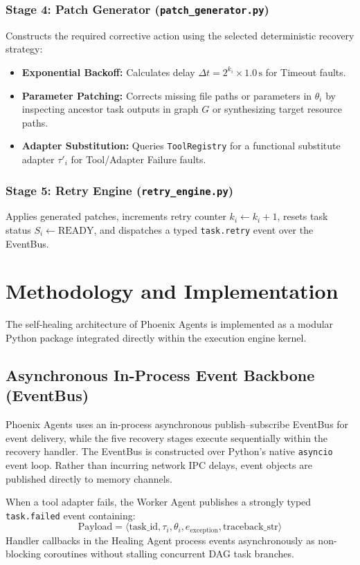 \documentclass[conference]{IEEEtran}
\newcommand{\chg}[1]{{\color{blue}#1}}
\begin{document}
\subsubsection{Stage 4: Patch Generator (\texttt{patch\_generator.py})}
Constructs the required corrective action using the selected deterministic recovery strategy:
\begin{itemize}
    \item \textbf{Exponential Backoff:} Calculates delay $\Delta t = 2^{k_i} \times 1.0\,\text{s}$ for Timeout faults.
    \item \textbf{Parameter Patching:} Corrects missing file paths or parameters in $\theta_i$ by inspecting ancestor task outputs in graph $G$ \chg{or synthesizing target resource paths.}
    \item \textbf{Adapter Substitution:} Queries \texttt{ToolRegistry} for a functional substitute adapter $\tau'_i$ for Tool/Adapter Failure faults.
\end{itemize}

\subsubsection{Stage 5: Retry Engine (\texttt{retry\_engine.py})}
Applies generated patches, increments retry counter $k_i \leftarrow k_i + 1$, resets task status $S_i \leftarrow \text{READY}$, and dispatches a typed \texttt{task.retry} \chg{event over the EventBus.}

\section{Methodology and Implementation}
The self-healing architecture of Phoenix Agents is implemented as a modular \chg{Python package} integrated directly within the execution engine kernel.

\subsection{Asynchronous In-Process Event Backbone (EventBus)}
Phoenix Agents uses an in-process asynchronous publish--subscribe EventBus for event delivery, while the five recovery stages execute sequentially within the recovery handler. The EventBus is constructed over Python's native \texttt{asyncio} event loop. Rather than incurring network IPC delays, event objects are published directly to memory channels.

When a tool adapter fails, the Worker Agent publishes a strongly typed \texttt{task.failed} event containing:
\begin{equation}
\text{Payload} = \langle \text{task\_id}, \tau_i, \theta_i, e_{\text{exception}}, \text{traceback\_str} \rangle
\end{equation}
Handler callbacks in the Healing Agent process events asynchronously as non-blocking coroutines without stalling concurrent DAG task branches.
\end{document}
